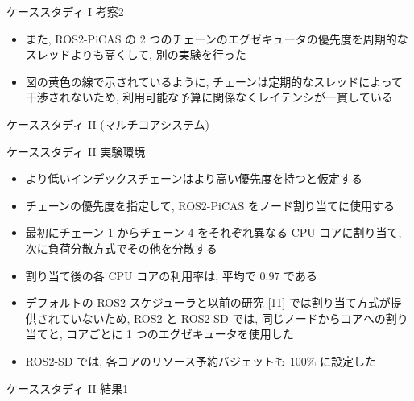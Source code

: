 \begin{frame}{ケーススタディ I 考察2}
    \begin{itemize}
        \item また, ROS2-PiCAS の 2 つのチェーンのエグゼキュータの優先度を周期的なスレッドよりも高くして, 別の実験を行った
        \item 図の黄色の線で示されているように, チェーンは定期的なスレッドによって干渉されないため, 利用可能な予算に関係なくレイテンシが一貫している
    \end{itemize}
\end{frame}

\begin{frame}{ケーススタディ II (マルチコアシステム)}
\end{frame}

\begin{frame}{ケーススタディ II 実験環境}
    \begin{itemize}
        \item より低いインデックスチェーンはより高い優先度を持つと仮定する
        \item チェーンの優先度を指定して, ROS2-PiCAS をノード割り当てに使用する
        \item 最初にチェーン 1 からチェーン 4 をそれぞれ異なる CPU コアに割り当て, 次に負荷分散方式でその他を分散する
        \item 割り当て後の各 CPU コアの利用率は, 平均で $0.97$ である
        \item デフォルトの ROS2 スケジューラと以前の研究 [11] では割り当て方式が提供されていないため, ROS2 と ROS2-SD では, 同じノードからコアへの割り当てと, コアごとに 1 つのエグゼキュータを使用した
        \item ROS2-SD では, 各コアのリソース予約バジェットも $100 \%$ に設定した
    \end{itemize}
\end{frame}

\begin{frame}{ケーススタディ II 結果1}
\end{frame}

